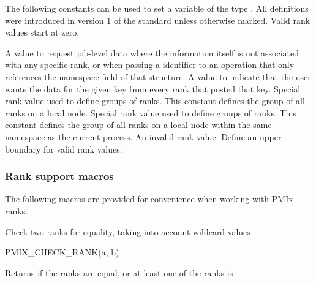 The following constants can be used to set a variable of the type . All definitions were introduced in version 1 of the standard unless otherwise marked. Valid rank values start at zero.

\begin{constantdesc}
%
A value to request job-level data where the information itself is not associated with any specific rank, or when passing a  identifier to an operation that only references the namespace field of that structure.
%
A value to indicate that the user wants the data for the given key from every rank that posted that key.
%
Special rank value used to define groups of ranks.
This constant defines the group of all ranks on a local node.
%
Special rank value used to define groups of ranks.
This constant defines the group of all ranks on a local node within the same namespace as the current process.
%
An invalid rank value.
%
Define an upper boundary for valid rank values.
%
\end{constantdesc}


\subsubsection{Rank support macros}

The following macros are provided for convenience when working with \ac{PMIx} ranks.


Check two ranks for equality, taking into account wildcard values

\cspecificstart
\begin{codepar}
PMIX_CHECK_RANK(a, b)
\end{codepar}
\cspecificend

\begin{arglist}
\end{arglist}

Returns  if the ranks are equal, or at least one of the ranks is 

